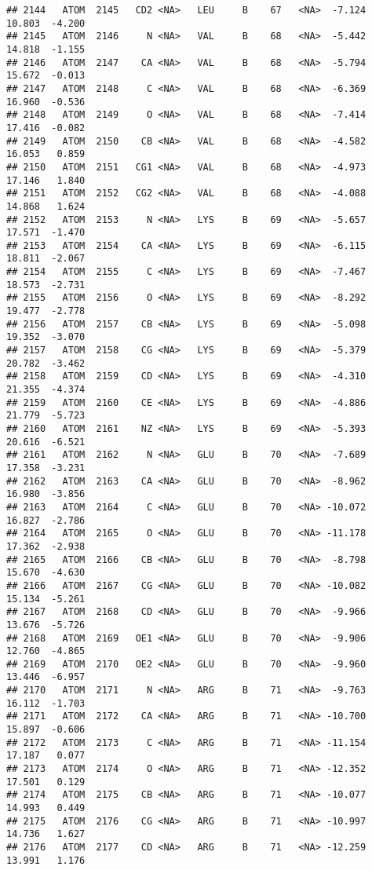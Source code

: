 \documentclass[
]{article}
\begin{document}
\begin{verbatim}
## 2144   ATOM  2145   CD2 <NA>   LEU     B    67   <NA>  -7.124  10.803  -4.200
## 2145   ATOM  2146     N <NA>   VAL     B    68   <NA>  -5.442  14.818  -1.155
## 2146   ATOM  2147    CA <NA>   VAL     B    68   <NA>  -5.794  15.672  -0.013
## 2147   ATOM  2148     C <NA>   VAL     B    68   <NA>  -6.369  16.960  -0.536
## 2148   ATOM  2149     O <NA>   VAL     B    68   <NA>  -7.414  17.416  -0.082
## 2149   ATOM  2150    CB <NA>   VAL     B    68   <NA>  -4.582  16.053   0.859
## 2150   ATOM  2151   CG1 <NA>   VAL     B    68   <NA>  -4.973  17.146   1.840
## 2151   ATOM  2152   CG2 <NA>   VAL     B    68   <NA>  -4.088  14.868   1.624
## 2152   ATOM  2153     N <NA>   LYS     B    69   <NA>  -5.657  17.571  -1.470
## 2153   ATOM  2154    CA <NA>   LYS     B    69   <NA>  -6.115  18.811  -2.067
## 2154   ATOM  2155     C <NA>   LYS     B    69   <NA>  -7.467  18.573  -2.731
## 2155   ATOM  2156     O <NA>   LYS     B    69   <NA>  -8.292  19.477  -2.778
## 2156   ATOM  2157    CB <NA>   LYS     B    69   <NA>  -5.098  19.352  -3.070
## 2157   ATOM  2158    CG <NA>   LYS     B    69   <NA>  -5.379  20.782  -3.462
## 2158   ATOM  2159    CD <NA>   LYS     B    69   <NA>  -4.310  21.355  -4.374
## 2159   ATOM  2160    CE <NA>   LYS     B    69   <NA>  -4.886  21.779  -5.723
## 2160   ATOM  2161    NZ <NA>   LYS     B    69   <NA>  -5.393  20.616  -6.521
## 2161   ATOM  2162     N <NA>   GLU     B    70   <NA>  -7.689  17.358  -3.231
## 2162   ATOM  2163    CA <NA>   GLU     B    70   <NA>  -8.962  16.980  -3.856
## 2163   ATOM  2164     C <NA>   GLU     B    70   <NA> -10.072  16.827  -2.786
## 2164   ATOM  2165     O <NA>   GLU     B    70   <NA> -11.178  17.362  -2.938
## 2165   ATOM  2166    CB <NA>   GLU     B    70   <NA>  -8.798  15.670  -4.630
## 2166   ATOM  2167    CG <NA>   GLU     B    70   <NA> -10.082  15.134  -5.261
## 2167   ATOM  2168    CD <NA>   GLU     B    70   <NA>  -9.966  13.676  -5.726
## 2168   ATOM  2169   OE1 <NA>   GLU     B    70   <NA>  -9.906  12.760  -4.865
## 2169   ATOM  2170   OE2 <NA>   GLU     B    70   <NA>  -9.960  13.446  -6.957
## 2170   ATOM  2171     N <NA>   ARG     B    71   <NA>  -9.763  16.112  -1.703
## 2171   ATOM  2172    CA <NA>   ARG     B    71   <NA> -10.700  15.897  -0.606
## 2172   ATOM  2173     C <NA>   ARG     B    71   <NA> -11.154  17.187   0.077
## 2173   ATOM  2174     O <NA>   ARG     B    71   <NA> -12.352  17.501   0.129
## 2174   ATOM  2175    CB <NA>   ARG     B    71   <NA> -10.077  14.993   0.449
## 2175   ATOM  2176    CG <NA>   ARG     B    71   <NA> -10.997  14.736   1.627
## 2176   ATOM  2177    CD <NA>   ARG     B    71   <NA> -12.259  13.991   1.176

\end{verbatim}
\end{document}

